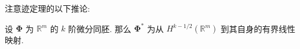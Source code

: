 注意迹定理的以下推论:

\begin{Corollary}
\label{cor:fractional-order-diffeomorphism-pullback}
设 $\bm{\Phi}$ 为 $\mathbb{R}^m$ 的 $k$ 阶微分同胚. 那么 $\bm{\Phi}^*$ 为从 $H^{k-1/2}(\mathbb{R}^m)$ 到其自身的有界线性映射.
\end{Corollary}

\begingroup
{}
\renewcommand{\endProof}{\par\nobreak\hfill$\blacksquare$\par\vspace{0.1cm}}
\endgroup
